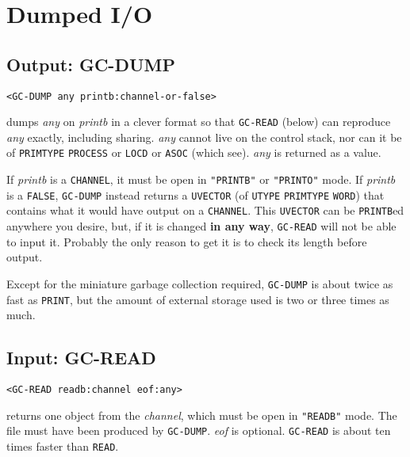 \documentclass[a4paper]{scrbook}
\begin{document}
\section{Dumped I/O}\label{dumped-io}

\subsection{Output: GC-DUMP}\label{output-gc-dump}

\begin{verbatim}
<GC-DUMP any printb:channel-or-false>
\end{verbatim}

 dumps \emph{any} on \emph{printb} in a clever format so that \texttt{GC-READ} (below) can
reproduce \emph{any} exactly, including sharing. \emph{any} cannot live on the control stack, nor can it be of
\texttt{PRIMTYPE} \texttt{PROCESS} or \texttt{LOCD} or \texttt{ASOC} (which see). \emph{any} is returned as a value.

If \emph{printb} is a \texttt{CHANNEL}, it must be open in \texttt{"PRINTB"} or \texttt{"PRINTO"} mode. If \emph{printb} is
a \texttt{FALSE}, \texttt{GC-DUMP} instead returns a \texttt{UVECTOR} (of \texttt{UTYPE} \texttt{PRIMTYPE} \texttt{WORD})
that contains what it would have output on a \texttt{CHANNEL}. This \texttt{UVECTOR} can be \texttt{PRINTB}ed anywhere you
desire, but, if it is changed \textbf{in any way}, \texttt{GC-READ} will not be able to input it. Probably the only reason
to get it is to check its length before output.

Except for the miniature garbage collection required, \texttt{GC-DUMP} is about twice as fast as \texttt{PRINT}, but the
amount of external storage used is two or three times as much.

\subsection{Input: GC-READ}\label{input-gc-read}

\begin{verbatim}
<GC-READ readb:channel eof:any>
\end{verbatim}

 returns one object from the \emph{channel}, which must be open in \texttt{"READB"} mode.
The file must have been produced by \texttt{GC-DUMP}. \emph{eof} is optional. \texttt{GC-READ} is about ten times faster
than \texttt{READ}.
\end{document}
